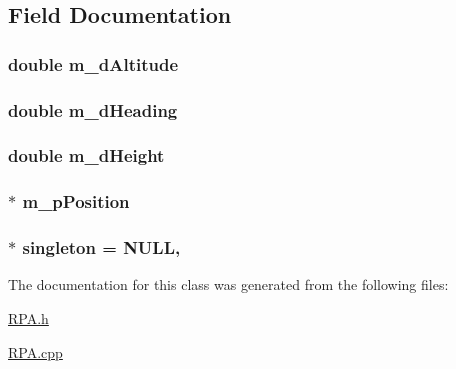\subsection{Field Documentation}
\hypertarget{a00012_a79a2bd07a373f3b0042e6c2dc0e51fc0}{
\subsubsection[{m\-\_\-d\-Altitude}]{\setlength{\rightskip}{0pt plus 5cm}double m\-\_\-d\-Altitude\hspace{0.3cm}{\ttfamily [private]}}}\label{a00012_a79a2bd07a373f3b0042e6c2dc0e51fc0}
\hypertarget{a00012_a610bb35047703e6c2c0176285cd09312}{
\subsubsection[{m\-\_\-d\-Heading}]{\setlength{\rightskip}{0pt plus 5cm}double m\-\_\-d\-Heading\hspace{0.3cm}{\ttfamily [private]}}}\label{a00012_a610bb35047703e6c2c0176285cd09312}
\hypertarget{a00012_a56427301298e19fe48b131d43376abce}{
\subsubsection[{m\-\_\-d\-Height}]{\setlength{\rightskip}{0pt plus 5cm}double m\-\_\-d\-Height\hspace{0.3cm}{\ttfamily [private]}}}\label{a00012_a56427301298e19fe48b131d43376abce}
\hypertarget{a00012_a0af541d1b4b8c59e4385c003e377b746}{
\subsubsection[{m\-\_\-p\-Position}]{$\ast$ m\-\_\-p\-Position\hspace{0.3cm}{\ttfamily [private]}}}\label{a00012_a0af541d1b4b8c59e4385c003e377b746}
\hypertarget{a00012_a90cad5e82f2f5e5e963848285d59a3f9}{
\subsubsection[{singleton}]{ $\ast$ singleton = N\-U\-L\-L\hspace{0.3cm}{\ttfamily [static]}, {\ttfamily [private]}}}\label{a00012_a90cad5e82f2f5e5e963848285d59a3f9}


The documentation for this class was generated from the following files\-:\begin{DoxyCompactItemize}
\item 
\hyperlink{a00037}{R\-P\-A.\-h}\item 
\hyperlink{a00036}{R\-P\-A.\-cpp}\end{DoxyCompactItemize}
